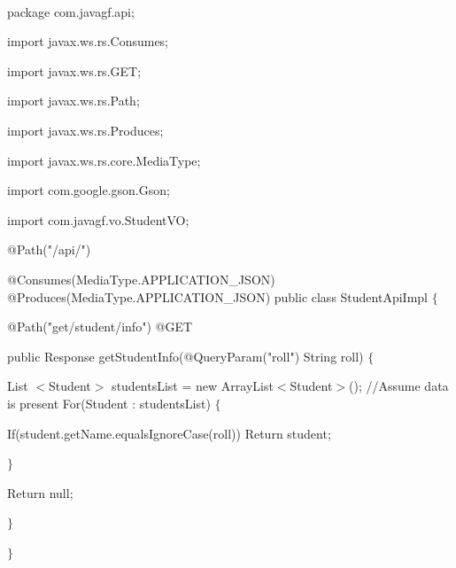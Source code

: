 \documentclass{article}
\begin{document}
\noindent 

\noindent \\ package com.javagf.api;

\noindent import javax.ws.rs.Consumes; 

\noindent import javax.ws.rs.GET; 

\noindent import javax.ws.rs.Path; 

\noindent import javax.ws.rs.Produces;

\noindent import javax.ws.rs.core.MediaType; 

\noindent import com.google.gson.Gson; 

\noindent import com.javagf.vo.StudentVO;

\noindent @Path("/api/") 

\noindent @Consumes(MediaType.APPLICATION\_JSON) @Produces(MediaType.APPLICATION\_JSON) public class StudentApiImpl $\mathrm{\{}$

\noindent @Path("get/student/info") @GET

\noindent public Response getStudentInfo(@QueryParam("roll") String roll) $\mathrm{\{}$

\noindent List $\mathrm{<}$Student$\mathrm{>}$ studentsList = new ArrayList$\mathrm{<}$Student$\mathrm{>}$(); //Assume data is present For(Student : studentsList) $\mathrm{\{}$

\noindent If(student.getName.equalsIgnoreCase(roll)) Return student;

\noindent $\mathrm{\}}$

\noindent Return null;

\noindent $\mathrm{\}}$

\noindent $\mathrm{\}}$

 

 

 

 

\noindent 
\end{document}
